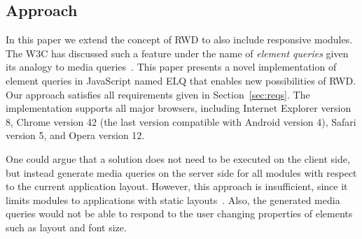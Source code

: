\documentclass{acm_proc_article-sp}
\newcommand{\elq}{ELQ}
\begin{document}
    \subsection{Approach}
      In this paper we extend the concept of RWD to also include responsive modules.
      The W3C has discussed such a feature under the name of \emph{element queries} given its analogy to media queries~\cite{w3c_eq_mail}.
      This paper presents a novel implementation of element queries in JavaScript named \elq{} that enables new possibilities of RWD.
      Our approach satisfies all requirements given in Section~\ref{sec:reqs}.
      The implementation supports all major browsers, including Internet Explorer version 8, Chrome version 42 (the last version compatible with Android version 4), Safari version 5, and Opera version 12.

      One could argue that a solution does not need to be executed on the client side, but instead generate media queries on the server side for all modules with respect to the current application layout.
      However, this approach is insufficient, since it limits modules to applications with static layouts~\cite{elq-thesis}. Also, the generated media queries would not be able to respond to the user changing properties of elements such as layout and font size.
\end{document}
